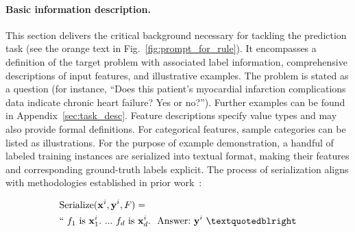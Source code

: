 \vspace*{-0.12in}
\paragraph{Basic information description.} This section delivers the critical background necessary for tackling the prediction task (see the orange text in Fig.~\ref{fig:prompt_for_rule}). It encompasses a definition of the target problem with associated label information, comprehensive descriptions of input features, and illustrative examples. The problem is stated as a question (for instance, “Does this patient’s myocardial infarction complications data indicate chronic heart failure? Yes or no?”). Further examples can be found in Appendix~\ref{sec:task_desc}. Feature descriptions specify value types and may also provide formal definitions. For categorical features, sample categories can be listed as illustrations. For the purpose of example demonstration, a handful of labeled training instances are serialized into textual format, making their features and corresponding ground-truth labels explicit. The process of serialization aligns with methodologies established in prior work~\cite{dinh2022lift,hegselmann2023tabllm}:

\begin{align}
&\text{Serialize}(\mathbf{x}^i,\mathbf{y}^i, F) = \nonumber \\ 
&``\ f_1\ \text{is}\ \mathbf{x}^i_1.\ ... \ f_d\  \text{is}\  \mathbf{x}^i_d.\ \ \text{Answer:}\  \mathbf{y}^i\ ”
\end{align}

\vspace*{-0.12in}
